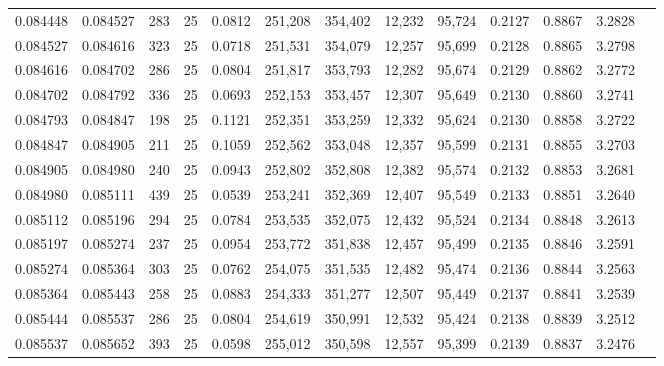 \begin{tabular}{rrrrrrrrrrrrr}
0.084448 & 0.084527 &   283 &  25 &                                     0.0812 & 251,208 & 354,402 &  12,232 &  95,724 & 0.2127 & 0.8867 & 3.2828 \\
0.084527 & 0.084616 &   323 &  25 &                                     0.0718 & 251,531 & 354,079 &  12,257 &  95,699 & 0.2128 & 0.8865 & 3.2798 \\
0.084616 & 0.084702 &   286 &  25 &                                     0.0804 & 251,817 & 353,793 &  12,282 &  95,674 & 0.2129 & 0.8862 & 3.2772 \\
0.084702 & 0.084792 &   336 &  25 &                                     0.0693 & 252,153 & 353,457 &  12,307 &  95,649 & 0.2130 & 0.8860 & 3.2741 \\
0.084793 & 0.084847 &   198 &  25 &                                     0.1121 & 252,351 & 353,259 &  12,332 &  95,624 & 0.2130 & 0.8858 & 3.2722 \\
0.084847 & 0.084905 &   211 &  25 &                                     0.1059 & 252,562 & 353,048 &  12,357 &  95,599 & 0.2131 & 0.8855 & 3.2703 \\
0.084905 & 0.084980 &   240 &  25 &                                     0.0943 & 252,802 & 352,808 &  12,382 &  95,574 & 0.2132 & 0.8853 & 3.2681 \\
0.084980 & 0.085111 &   439 &  25 &                                     0.0539 & 253,241 & 352,369 &  12,407 &  95,549 & 0.2133 & 0.8851 & 3.2640 \\
0.085112 & 0.085196 &   294 &  25 &                                     0.0784 & 253,535 & 352,075 &  12,432 &  95,524 & 0.2134 & 0.8848 & 3.2613 \\
0.085197 & 0.085274 &   237 &  25 &                                     0.0954 & 253,772 & 351,838 &  12,457 &  95,499 & 0.2135 & 0.8846 & 3.2591 \\
0.085274 & 0.085364 &   303 &  25 &                                     0.0762 & 254,075 & 351,535 &  12,482 &  95,474 & 0.2136 & 0.8844 & 3.2563 \\
0.085364 & 0.085443 &   258 &  25 &                                     0.0883 & 254,333 & 351,277 &  12,507 &  95,449 & 0.2137 & 0.8841 & 3.2539 \\
0.085444 & 0.085537 &   286 &  25 &                                     0.0804 & 254,619 & 350,991 &  12,532 &  95,424 & 0.2138 & 0.8839 & 3.2512 \\
0.085537 & 0.085652 &   393 &  25 &                                     0.0598 & 255,012 & 350,598 &  12,557 &  95,399 & 0.2139 & 0.8837 & 3.2476 \\

\end{tabular}
